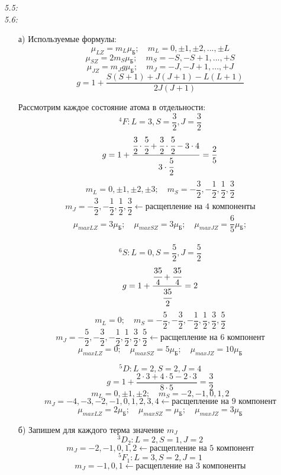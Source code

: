 	\emph{5.5: } \\

	\emph{5.6: } \\
		\vspace*{-1em}
		\begin{itemize}\itemsep-8pt
			\item[а)] Используемые формулы:
			\[ 
				\mu_{LZ} = m_L\mu_\text{Б};\quad
				m_L = 0, \pm1, \pm2, ..., \pm L 
			\]
			\[ 
				\mu_{SZ} = 2m_S\mu_\text{Б};\quad
				m_S = -S, -S+1, ..., +S  
			\]
			\[ 
				\mu_{JZ} = m_J g\mu_\text{Б};\quad
				m_J = -J, -J+1, ..., +J  
			\]
			\[ g = 1 + \frac{S(S+1)+J(J+1)-L(L+1)}{2J(J+1)} \]

			Рассмотрим каждое состояние атома в отдельности:
			\[ ^4F: L=3, S=\frac{3}{2}, J= \frac{3}{2} \]
			\[ 
				g = 1 + \frac{\cfrac{3}{2}\cdot\cfrac{5}{2} 
				+ \cfrac{3}{2}\cdot\cfrac{5}{2} - 3\cdot4}{3\cdot\cfrac{5}{2}} 
				= \frac{2}{5}  
			\]
			\[ 
				m_L = 0, \pm1, \pm2, \pm3;\quad
				m_S = -\frac{3}{2}, -\frac{1}{2}, \frac{1}{2}, \frac{3}{2}
			\]
			\[
				m_J = -\frac{3}{2}, -\frac{1}{2}, \frac{1}{2}, \frac{3}{2} \leftarrow 
				\text{расщепление на 4 компоненты}
			\]
			\[ 
				\mu_{maxLZ} = 3\mu_\text{Б};\quad
				\mu_{maxSZ} = 3\mu_\text{Б};\quad
				\mu_{maxJZ} = \frac{6}{5}\mu_\text{Б};
			\] \\

			\[ ^6S: L=0, S=\frac{5}{2}, J= \frac{5}{2} \]
			\[ g = 1 + \frac{\cfrac{35}{4}+\cfrac{35}{4}}{\cfrac{35}{2}} = 2\]
			\[ 
				m_L = 0;\quad
				m_S = -\frac{5}{2}, -\frac{3}{2}, -\frac{1}{2}, 
				\frac{1}{2}, \frac{3}{2}, \frac{5}{2}
			\]
			\[
				m_J = -\frac{5}{2}, -\frac{3}{2}, -\frac{1}{2}, \frac{1}{2}, 
				\frac{3}{2}, \frac{5}{2} \leftarrow \text{расщепление на 6 компонент}
			\]
			\[ 
				\mu_{maxLZ} = 0;\quad
				\mu_{maxSZ} = 5\mu_\text{Б};\quad
				\mu_{maxJZ} = 10\mu_\text{Б}
			\]

			\[ ^5D: L=2, S=2, J=4\]
			\[ g = 1 + \frac{2\cdot3 + 4\cdot5 - 2\cdot3}{8\cdot5} = \frac{3}{2}\]
			\[ 
				m_L = 0, \pm1, \pm2;\quad
				m_S = -2, -1, 0, 1, 2
			\]
			\[
				m_J = -4, -3, -2, -1, 0, 1, 2, 3, 4 \leftarrow 
				\text{расщепление на 9 компонент}
			\]
			\[ 
				\mu_{maxLZ} = 2\mu_\text{Б};\quad
				\mu_{maxSZ} = \mu_\text{Б};\quad
				\mu_{maxJZ} = 3\mu_\text{Б}
			\]
			\item[б)] Запишем для каждого терма значение \( m_J \)
			\[ ^3D_2: L=2, S=1, J=2 \]
			\[ m_J = -2, -1, 0, 1, 2 \leftarrow \text{расщепление на 5 компонент} \]
			\[ ^5F_1: L=3, S=2, J=1 \]
			\[ m_J = -1, 0, 1 \leftarrow \text{расщепление на 3 компоненты} \]
		\end{itemize}

